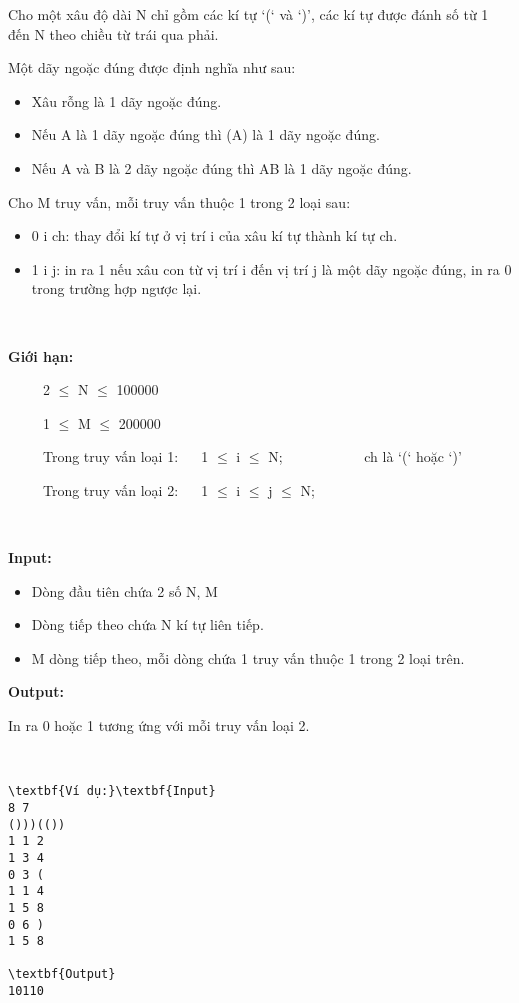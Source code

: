 

Cho một xâu độ dài N chỉ gồm các kí tự ‘(‘ và ‘)’, các kí tự được đánh số từ 1 đến N theo chiều từ trái qua phải.

Một dãy ngoặc đúng được định nghĩa như sau:
\begin{itemize}
	\item Xâu rỗng là 1 dãy ngoặc đúng.
	\item Nếu A là 1 dãy ngoặc đúng thì (A) là 1 dãy ngoặc đúng.
	\item Nếu A và B là 2 dãy ngoặc đúng thì AB là 1 dãy ngoặc đúng.
\end{itemize}

Cho M truy vấn, mỗi truy vấn thuộc 1 trong 2 loại sau:
\begin{itemize}
	\item 0 i ch: thay đổi kí tự ở vị trí i của xâu kí tự thành kí tự ch.
	\item 1 i j: in ra 1 nếu xâu con từ vị trí i đến vị trí j là một dãy ngoặc đúng, in ra 0 trong trường hợp ngược lại.
\end{itemize}

 

\textbf{Giới hạn:}

      2  $\le$  N  $\le$  100000

      1  $\le$  M  $\le$  200000

      Trong truy vấn loại 1:    1  $\le$  i  $\le$  N;              ch là ‘(‘ hoặc ‘)’

      Trong truy vấn loại 2:    1  $\le$  i  $\le$  j  $\le$  N;

 

\textbf{Input:}
\begin{itemize}
	\item Dòng đầu tiên chứa 2 số N, M
	\item Dòng tiếp theo chứa N kí tự liên tiếp.
	\item M dòng tiếp theo, mỗi dòng chứa 1 truy vấn thuộc 1 trong 2 loại trên.
\end{itemize}

\textbf{Output:}

In ra 0 hoặc 1 tương ứng với mỗi truy vấn loại 2.

 
\begin{verbatim}
\textbf{Ví dụ:}\textbf{Input}
8 7
()))(())
1 1 2
1 3 4
0 3 (
1 1 4
1 5 8
0 6 )
1 5 8

\textbf{Output}
10110\end{verbatim}
